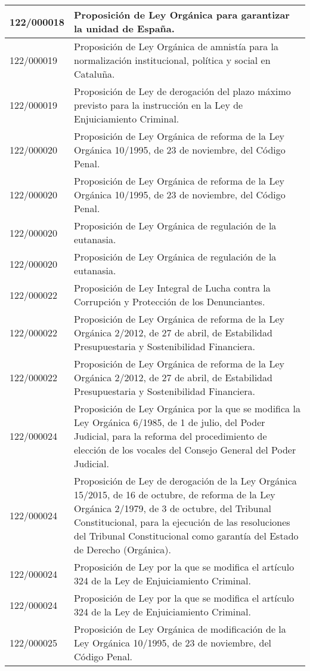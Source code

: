 {\begin{table}[H]
\begin{center}
\begin{tabularx}{\linewidth}{| l | X |}
\hline
122/000018 & Proposición de Ley Orgánica para garantizar la unidad de España. \\
\hline
122/000019 & Proposición de Ley Orgánica de amnistía para la normalización institucional, política y social en Cataluña. \\
\hline
122/000019 & Proposición de Ley de derogación del plazo máximo previsto para la instrucción en la Ley de Enjuiciamiento Criminal. \\
\hline
122/000020 & Proposición de Ley Orgánica de reforma de la Ley Orgánica 10/1995, de 23 de noviembre, del Código Penal. \\
\hline
122/000020 & Proposición de Ley Orgánica de reforma de la Ley Orgánica 10/1995, de 23 de noviembre, del Código Penal. \\
\hline
122/000020 & Proposición de Ley Orgánica de regulación de la eutanasia. \\
\hline
122/000020 & Proposición de Ley Orgánica de regulación de la eutanasia. \\
\hline
122/000022 & Proposición de Ley Integral de Lucha contra la Corrupción y Protección de los Denunciantes. \\
\hline
122/000022 & Proposición de Ley Orgánica de reforma de la Ley Orgánica 2/2012, de 27 de abril, de Estabilidad Presupuestaria y Sostenibilidad Financiera. \\
\hline
122/000022 & Proposición de Ley Orgánica de reforma de la Ley Orgánica 2/2012, de 27 de abril, de Estabilidad Presupuestaria y Sostenibilidad Financiera. \\
\hline
122/000024 & Proposición de Ley Orgánica por la que se modifica la Ley Orgánica 6/1985, de 1 de julio, del Poder Judicial, para la reforma del procedimiento de elección de los vocales del Consejo General del Poder Judicial. \\
\hline
122/000024 & Proposición de Ley de derogación de la Ley Orgánica 15/2015, de 16 de octubre, de reforma de la Ley Orgánica 2/1979, de 3 de octubre, del Tribunal Constitucional, para la ejecución de las resoluciones del Tribunal Constitucional como garantía del Estado de Derecho (Orgánica). \\
\hline
122/000024 & Proposición de Ley por la que se modifica el artículo 324 de la Ley de Enjuiciamiento Criminal. \\
\hline
122/000024 & Proposición de Ley por la que se modifica el artículo 324 de la Ley de Enjuiciamiento Criminal. \\
\hline
122/000025 & Proposición de Ley Orgánica de modificación de la Ley Orgánica 10/1995, de 23 de noviembre, del Código Penal. \\

\end{tabularx}
\end{center}
\end{table}}
